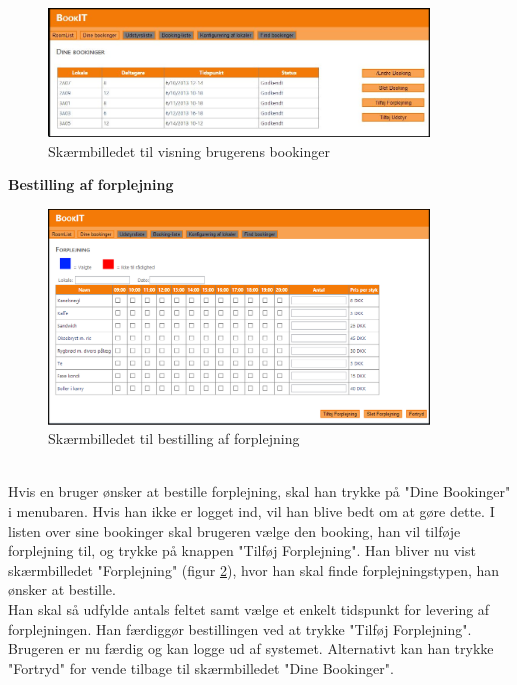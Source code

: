 \begin{figure}[h!]
  \centering
    \includegraphics[width=0.9\textwidth]{Appendix/GUI-Prototype/DigitalMockup/DineBookinger}
  \caption{Skærmbilledet til visning brugerens bookinger}
\label{Design_G_wf_YourBookings_Final}
\end{figure}

\textbf{Bestilling af forplejning}
\begin{figure}[h!]
  \centering
    \includegraphics[width=0.9\textwidth]{Appendix/GUI-Prototype/DigitalMockup/Forplejning}
  \caption{Skærmbilledet til bestilling af forplejning}
\label{Design_G_wf_Forplejning_Final}
\end{figure} 
\\Hvis en bruger ønsker at bestille forplejning, skal han trykke på "Dine Bookinger" i menubaren. Hvis han ikke er logget ind, vil han blive bedt om at gøre dette. I listen over sine bookinger skal brugeren vælge den booking, han vil tilføje forplejning til, og trykke på knappen "Tilføj Forplejning". Han bliver nu vist skærmbilledet "Forplejning" (figur \ref{Design_G_wf_Forplejning_Final}), hvor han skal finde forplejningstypen, han ønsker at bestille. 
\\Han skal så udfylde antals feltet samt vælge et enkelt tidspunkt for levering af forplejningen. Han færdiggør bestillingen ved at trykke "Tilføj Forplejning". Brugeren er nu færdig og kan logge ud af systemet. Alternativt kan han trykke "Fortryd" for vende tilbage til skærmbilledet "Dine Bookinger".

